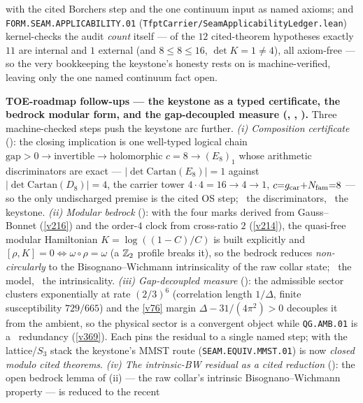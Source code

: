 with the cited Borchers step and the one continuum input as named axioms; and
\texttt{FORM.SEAM.APPLICABILITY.01} (\texttt{TfptCarrier/SeamApplicabilityLedger.lean}) kernel-checks the audit
\emph{count} itself --- of the $12$ cited-theorem hypotheses exactly $11$ are internal and $1$ external (and
$8\le8\le16$, $\det K{=}1\neq4$), all axiom-free --- so the very bookkeeping the keystone's honesty rests on is
machine-verified, leaving only the one named continuum fact open.
\par\smallskip\noindent\textbf{TOE-roadmap follow-ups --- the keystone as a typed certificate, the bedrock
modular form, and the gap-decoupled measure (, ,
).} Three machine-checked steps push the keystone arc further.
\emph{(i) Composition certificate} (): the closing implication is one well-typed
logical chain $\text{gap}{>}0\to\text{invertible}\to\text{holomorphic }c{=}8\to(E_8)_1$ whose arithmetic
discriminators are exact --- $|\det\mathrm{Cartan}(E_8)|{=}1$ against $|\det\mathrm{Cartan}(D_8)|{=}4$, the carrier
tower $4{\cdot}4{=}16\to4\to1$, $c{=}g_{\mathrm{car}}{+}N_{\mathrm{fam}}{=}8$ --- so the only undischarged premise is the cited OS step;
\mE\ the discriminators, \mO\ the keystone. \emph{(ii) Modular bedrock} (): with the
four marks derived from Gauss--Bonnet (\vref{v216}) and the order-$4$ clock from cross-ratio $2$ (\vref{v214}), the
quasi-free modular Hamiltonian $K=\log((1{-}C)/C)$ is built explicitly and $[\rho,K]{=}0\Leftrightarrow
\omega{\circ}\rho{=}\omega$ (a $\mathbb Z_2$ profile breaks it), so the bedrock reduces \emph{non-circularly} to the
Bisognano--Wichmann intrinsicality of the raw collar state; \mE\ the model, \mO\ the intrinsicality.
\emph{(iii) Gap-decoupled measure} (): the admissible sector clusters
exponentially at rate $(2/3)^6$ (correlation length $1/\Delta$, finite susceptibility $729/665$) and the \vref{v76}
margin $\Delta-31/(4\pi^2)>0$ decouples it from the ambient, so the physical sector is a convergent object
while \texttt{QG.AMB.01} is a \mC\ redundancy (\vref{v369}). Each pins the residual to a single named step; with the
lattice/$S_3$ stack the keystone's MMST route (\texttt{SEAM.EQUIV.MMST.01}) is now \emph{closed modulo cited
theorems}.
\emph{(iv) The intrinsic-BW residual as a cited reduction} (): the open
bedrock lemma of (ii) --- the raw collar's intrinsic Bisognano--Wichmann property --- is reduced to the recent
